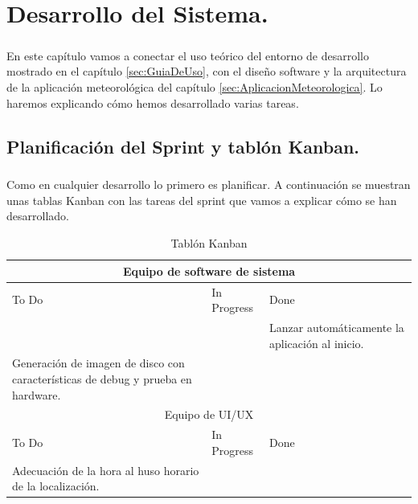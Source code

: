 \chapter{Desarrollo del Sistema.}\label{sec:Desarrollo}

\paragraph{}En este capítulo vamos a conectar el uso teórico del entorno de desarrollo
mostrado en el capítulo \ref{sec:GuiaDeUso}, con el diseño software y la arquitectura de
la aplicación meteorológica del capítulo \ref{sec:AplicacionMeteorologica}. Lo haremos
explicando cómo hemos desarrollado varias tareas.

\section{Planificación del Sprint y tablón Kanban.}

\paragraph{}Como en cualquier desarrollo lo primero es planificar. A continuación se
muestran unas tablas Kanban con las tareas del sprint que vamos a explicar cómo se
han desarrollado.

\begin{table}[H]
\begin{center}
\begin{tabular}{| p{} | p{} | p{} |}
    \hline
    \multicolumn{3}{|c|}{Equipo de software de sistema} \\
    \hline
    To Do & In Progress & Done \\
    \hline
    &  & Lanzar automáticamente la aplicación al inicio. \\
    Generación de imagen de disco con características de debug y prueba en hardware. & & \\
    \hline
    \hline
    \multicolumn{3}{|c|}{Equipo de UI/UX} \\
    \hline
    To Do & In Progress & Done \\
    \hline
    Adecuación de la hora al huso horario de la localización. &  & \\
    \hline
\end{tabular}
\caption{Tablón Kanban}
\label{tab:Kanban}
\end{center}
\end{table}

